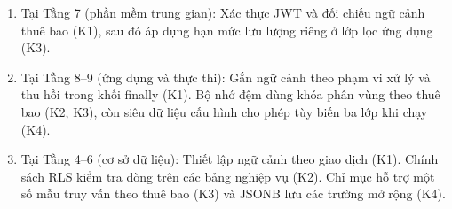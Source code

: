 \begin{landscape}
\renewcommand{\VfourImageMaxHeight}{.55\textheight}
\begin{enumerate}
\def\labelenumi{\arabic{enumi}.}
\item
  Tại Tầng 7 (phần mềm trung gian): Xác thực JWT và đối chiếu ngữ cảnh thuê bao (K1), sau đó áp dụng hạn mức lưu lượng riêng ở lớp lọc ứng dụng (K3).
\item
  Tại Tầng 8--9 (ứng dụng và thực thi): Gắn ngữ cảnh theo phạm vi xử lý và thu hồi trong khối finally (K1). Bộ nhớ đệm dùng khóa phân vùng theo thuê bao (K2, K3), còn siêu dữ liệu cấu hình cho phép tùy biến ba lớp khi chạy (K4).
\item
  Tại Tầng 4--6 (cơ sở dữ liệu): Thiết lập ngữ cảnh theo giao dịch (K1). Chính sách RLS kiểm tra dòng trên các bảng nghiệp vụ (K2). Chỉ mục hỗ trợ một số mẫu truy vấn theo thuê bao (K3) và JSONB lưu các trường mở rộng (K4).
\end{enumerate}


\end{landscape}
